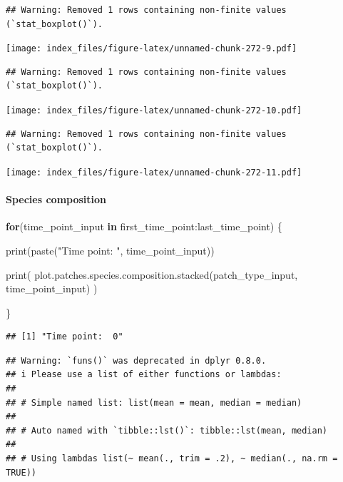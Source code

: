 \documentclass[
]{article}
\newenvironment{Shaded}{\begin{snugshade}}{\end{snugshade}}
\newcommand{\ControlFlowTok}[1]{\textcolor[rgb]{0.13,0.29,0.53}{\textbf{#1}}}
\newcommand{\FunctionTok}[1]{\textcolor[rgb]{0.00,0.00,0.00}{#1}}
\newcommand{\NormalTok}[1]{#1}
\newcommand{\SpecialCharTok}[1]{\textcolor[rgb]{0.00,0.00,0.00}{#1}}
\newcommand{\StringTok}[1]{\textcolor[rgb]{0.31,0.60,0.02}{#1}}
\begin{document}
\begin{verbatim}
## Warning: Removed 1 rows containing non-finite values (`stat_boxplot()`).
\end{verbatim}

\texttt{[image: index\_files/figure-latex/unnamed-chunk-272-9.pdf]}

\begin{verbatim}
## Warning: Removed 1 rows containing non-finite values (`stat_boxplot()`).
\end{verbatim}

\texttt{[image: index\_files/figure-latex/unnamed-chunk-272-10.pdf]}

\begin{verbatim}
## Warning: Removed 1 rows containing non-finite values (`stat_boxplot()`).
\end{verbatim}

\texttt{[image: index\_files/figure-latex/unnamed-chunk-272-11.pdf]}

\hypertarget{species-composition}{%
\paragraph{Species composition}\label{species-composition}}

\begin{Shaded}
\begin{Highlighting}[]
\ControlFlowTok{for}\NormalTok{(time\_point\_input }\ControlFlowTok{in}\NormalTok{ first\_time\_point}\SpecialCharTok{:}\NormalTok{last\_time\_point) \{}
  
  \FunctionTok{print}\NormalTok{(}\FunctionTok{paste}\NormalTok{(}\StringTok{"Time point: "}\NormalTok{, time\_point\_input))}
  
  \FunctionTok{print}\NormalTok{(}
    \FunctionTok{plot.patches.species.composition.stacked}\NormalTok{(patch\_type\_input,}
\NormalTok{                                             time\_point\_input)}
\NormalTok{  )}
  
\NormalTok{\}}
\end{Highlighting}
\end{Shaded}

\begin{verbatim}
## [1] "Time point:  0"
\end{verbatim}

\begin{verbatim}
## Warning: `funs()` was deprecated in dplyr 0.8.0.
## i Please use a list of either functions or lambdas:
## 
## # Simple named list: list(mean = mean, median = median)
## 
## # Auto named with `tibble::lst()`: tibble::lst(mean, median)
## 
## # Using lambdas list(~ mean(., trim = .2), ~ median(., na.rm = TRUE))
\end{verbatim}
\end{document}
